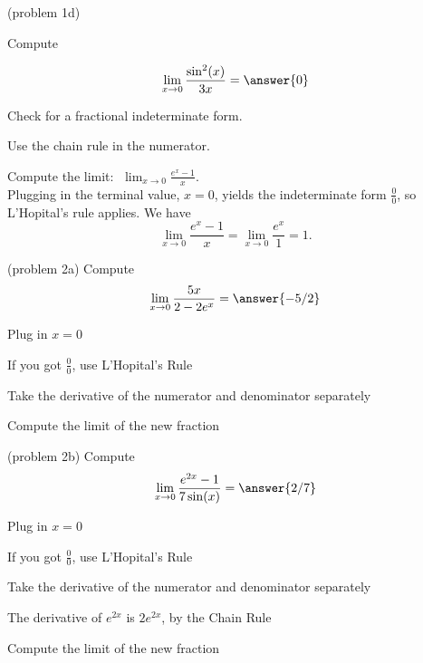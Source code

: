\documentclass[handout]{ximera}
\begin{document}
\begin{problem}(problem 1d)

Compute

        \[  \lim_{x \to 0} \frac{\sin^2(x)}{3x} = \answer{0} \]
  
   \begin{hint}   Check for a fractional indeterminate form.  \end{hint}
    
   \begin{hint}   Use the chain rule in the numerator.        \end{hint}
		
\end{problem}



\begin{example}[example 2]
 Compute the limit:  $\displaystyle{\;\lim_{x \to 0} \frac{e^x - 1}{x}}.$\\
Plugging in the terminal value, $x=0$, yields 
the indeterminate form $\frac00$, so L'Hopital's rule applies.
We have 
\[\lim_{x \to 0} \frac{e^x - 1}{x} = \lim_{x \to 0} \frac{e^x}{1} = 1.\]
\end{example}


\begin{problem}(problem 2a)
  Compute
  \[
  \lim_{x \to 0} \frac{5x}{2 - 2e^x} = \answer{-5/2}
  \]
  
    \begin{hint}
      Plug in $x=0$
    \end{hint}
    \begin{hint}
      If you got $\frac00$, use L'Hopital's Rule
    \end{hint}
    \begin{hint}
      Take the derivative of the numerator and denominator separately
    \end{hint}
	  \begin{hint}
      Compute the limit of the new fraction
    \end{hint}
	
\end{problem}


\begin{problem}(problem 2b)
  Compute
  \[
  \lim_{x \to 0} \frac{e^{2x} -1}{7\sin(x)} = \answer{2/7}
  \]
  
    \begin{hint}
      Plug in $x=0$
    \end{hint}
    \begin{hint}
      If you got $\frac00$, use L'Hopital's Rule
    \end{hint}
    \begin{hint}
      Take the derivative of the numerator and denominator separately
    \end{hint}
		\begin{hint}
		 The derivative of $e^{2x}$ is $2e^{2x}$, by the Chain Rule
	  \end{hint}
		\begin{hint}
      Compute the limit of the new fraction
    \end{hint}
    
\end{problem}
\end{document}
